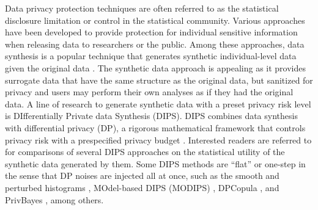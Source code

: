 \documentclass[12pt, A4]{article}
\theoremstyle{plain}
\theoremstyle{exampstyle}\newtheorem{defn}{Definition}
\theoremstyle{exampstyle}\newtheorem{lem}{Lemma}
\theoremstyle{exampstyle}\newtheorem{cor}{Corollary}
\theoremstyle{exampstyle}\newtheorem{pro}{Proposition}
\theoremstyle{exampstyle}\newtheorem{cla}{Claim}
\theoremstyle{exampstyle}\newtheorem{rem}{Remark}
\begin{document}
Data privacy protection techniques are often referred to as the statistical disclosure limitation or control in the statistical community. Various approaches have been developed to provide protection for individual sensitive information when releasing data to researchers or the public. Among these approaches, data synthesis is a popular technique that generates synthetic individual-level data given the original data \citep{rubin1993discussion, little1993statistical, liu2003,raghunathan2003multiple, reiter2003,  liu2004, reiter2009, drechsler2011book}. The synthetic data approach is appealing as it provides surrogate data that have the same structure as the original data, but sanitized for privacy and users may perform their own analyses as if they had the original data. A line of research to generate synthetic data with a preset privacy risk level is DIfferentially Private data Synthesis (DIPS). DIPS combines data synthesis with differential privacy (DP), a rigorous mathematical framework that controls privacy risk with a prespecified privacy budget  \citep{dwork2006calibrating}. Interested readers are referred to \citet{bowen2016differentially} for comparisons of several DIPS approaches on the statistical utility of the synthetic data generated by them. Some DIPS methods are ``flat'' or one-step in the sense that DP noises are injected all at once, such as the smooth and perturbed histograms \citep{wasserman2010statistical}, MOdel-based DIPS (MODIPS) \citep{liu2016model}, DPCopula \citep{DPcopula}, and PrivBayes \citep{privbayes},  among others.  
\end{document}
